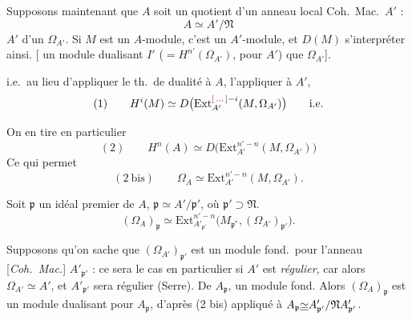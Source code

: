 \documentclass[11pt,a4paper]{article}
\begin{document}
Supposons maintenant que $A$ soit un quotient d'un anneau local
\struck{\ill{}} Coh.\ Mac.\ $A'$ \struck{\ill{}} :
\[
  A \simeq A'/\mathfrak{N}
\]
 $A'$  d'un $\Omega_{A'}$. Si $M$ est
un $A$-module, c'est un $A'$-module, et $D(M)$ 
s'interpréter ainsi. [ un module dualisant
$I'$ ($= H^{n'}(\Omega_{A'})$, pour $A'$)  que
$\Omega_{A'}$]. \ill{} \ill{} \ill{}

i.e.\ au lieu d'appliquer le th.\ de dualité à $A$, l'appliquer à $A'$,
\[
  (1) \qquad H^i(M) \simeq
  D\bigl(\mathrm{Ext}^{\ill{}-i}_{A'}(M, \Omega_{A'})\bigr)
  \qquad \text{i.e.}
\]

On en tire en particulier
\[
  (2) \qquad H^n(A) \simeq
  D\bigl(\mathrm{Ext}^{n'-n}_{A'}(M, \Omega_{A'})\bigr)
\]
Ce qui permet \ill{} 
 \struck{\ill{}}  
\[
  (2\ \text{bis}) \qquad \Omega_A \simeq
  \mathrm{Ext}^{n'-n}_{A'}(M, \Omega_{A'}) .
\]


Soit $\mathfrak{p}$ un idéal premier de $A$, \ill{}
$\mathfrak{p} \simeq A'/\mathfrak{p}'$,
où $\mathfrak{p}' \supset \mathfrak{N}$. 
\[
  (\Omega_A)_{\mathfrak{p}} \simeq
  \mathrm{Ext}^{n'-n}_{A'_{\mathfrak{p}'}}\bigl(M_{\mathfrak{p}^*},
  (\Omega_{A'})_{\mathfrak{p}'}\bigr) .
\]

Supposons qu'on sache que
$(\Omega_{A'})_{\mathfrak{p}'}$ est un module fond.\ pour l'anneau
[\emph{Coh.\ Mac.}] $A'_{\mathfrak{p}'}$ : ce sera le cas en particulier si
$A'$ est \emph{régulier}, car alors $\Omega_{A'} \simeq A'$, et
$A'_{\mathfrak{p}'}$ sera régulier (Serre). De
$A_{\mathfrak{p}}$, \ill{} \ill{} un module fond. Alors
$(\Omega_A)_{\mathfrak{p}}$ est un module dualisant pour
$A_{\mathfrak{p}}$, d'après (2 bis) appliqué à
$A_{\mathfrak{p}} \uncertain{\simeq}
A'_{\mathfrak{p}'}/\mathfrak{N}A'_{\mathfrak{p}'}$.
\end{document}
